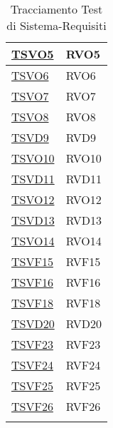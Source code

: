 \begin{longtable}[ht]{|>{\centering}m{5cm}|m{5cm}<{\centering}|}
\hyperlink{TSVO5}{TSVO5} & RVO5\\ \hline
\hyperlink{TSVO6}{TSVO6} & RVO6\\ \hline
\hyperlink{TSVO7}{TSVO7} & RVO7\\ \hline
\hyperlink{TSVO8}{TSVO8} & RVO8\\ \hline
\hyperlink{TSVD9}{TSVD9} & RVD9\\ \hline
\hyperlink{TSVO10}{TSVO10} & RVO10\\ \hline
\hyperlink{TSVD11}{TSVD11} & RVD11\\ \hline
\hyperlink{TSVO12}{TSVO12} & RVO12\\ \hline
\hyperlink{TSVD13}{TSVD13} & RVD13\\ \hline
\hyperlink{TSVO14}{TSVO14} & RVO14\\ \hline
\hyperlink{TSVF15}{TSVF15} & RVF15\\ \hline
\hyperlink{TSVF16}{TSVF16} & RVF16\\ \hline
\hyperlink{TSVF18}{TSVF18} & RVF18\\ \hline
\hyperlink{TSVD20}{TSVD20} & RVD20\\ \hline
\hyperlink{TSVF23}{TSVF23} & RVF23\\ \hline
\hyperlink{TSVF24}{TSVF24} & RVF24\\ \hline
\hyperlink{TSVF25}{TSVF25} & RVF25\\ \hline
\hyperlink{TSVF26}{TSVF26} & RVF26\\ \hline
\caption[Tracciamento Test di Sistema-Requisiti]{Tracciamento Test di Sistema-Requisiti}
\label{tabella:ts-requi}
\end{longtable}
\clearpage
\FloatBarrier

